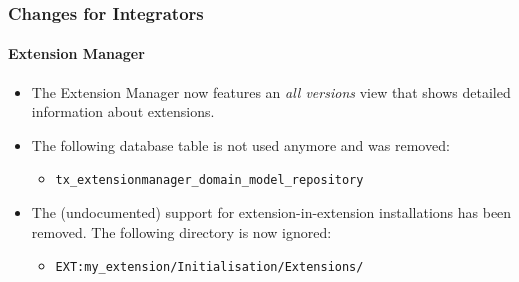 %

\begin{frame}[fragile]
	\frametitle{Changes for Integrators}
	\framesubtitle{Extension Manager}

	\begin{itemize}
		\item The Extension Manager now features an \textit{all versions} view
			that shows detailed information about extensions.
		\item The following database table is not used anymore and was removed:
			\begin{itemize}\smaller
				\item \texttt{tx\_extensionmanager\_domain\_model\_repository}
			\end{itemize}\normalsize
			\vspace{0.4cm}

		\item The (undocumented) support for extension-in-extension installations
			has been removed. The following directory is now ignored:
			\begin{itemize}\smaller
				\item \texttt{EXT:my\_extension/Initialisation/Extensions/}
			\end{itemize}
	\end{itemize}

\end{frame}


